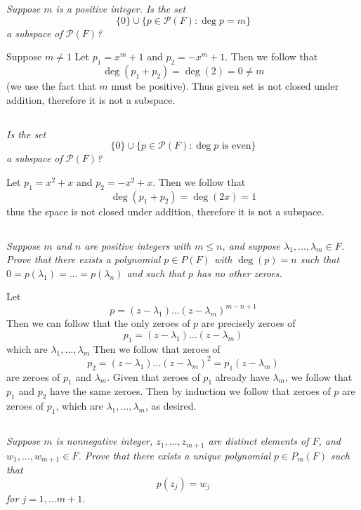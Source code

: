 \documentclass[11pt,oneside,titlepage]{book}
\begin{document}
\textit{Suppose $m$ is a positive integer. Is the set}
$$ \{0\} \cup \{p \in \mathcal{P}(F): \deg p = m\}$$
\textit{a subspace of $\mathcal{P}(F)$?}

Suppose $m \neq 1$
Let $p_1 = x^m + 1$ and $p_2 = -x^m + 1$. Then we follow that
$$\deg(p_1 + p_2) = \deg(2) = 0 \neq m $$
(we use the fact that $m$ must be positive). Thus given set is not closed under addition,
therefore it is not a subspace.

\subsection{}

\textit{Is the set}
$$\{0\} \cup \{p \in \mathcal{P}(F): \deg p \text{ is even}\}$$
\textit{a subspace of $\mathcal P (F)$?}

Let $p_1 = x^2 + x$ and $p_2 = -x^2 + x$. Then we follow that
$$\deg(p_1 + p_2) = \deg(2x) = 1$$
thus the space is not closed under addition, therefore it is not a subspace.

\subsection{}

\textit{Suppose $m$ and $n$ are positive integers with $m \leq n$, and suppose
  $\lambda_1, ..., \lambda_m \in F$. Prove that there exists a polynomial $p \in P(F)$
  with $\deg(p) = n$ such that $0 = p(\lambda_1) = ... = p(\lambda_n)$ and such that
  $p$ has no other zeroes.}

Let
$$p = (z - \lambda_1) ... (z - \lambda_m)^{m - n + 1}$$
Then we can follow that the only zeroes of $p$ are precisely zeroes of
$$p_1 = (z - \lambda_1) ... (z - \lambda_{m})$$
which are $\lambda_1, ..., \lambda_{m}$
Then  we follow that zeroes of
$$p_2 = (z - \lambda_1) ... (z - \lambda_{m})^2 = p_1(z - \lambda_m)$$
are zeroes of $p_1$ and $\lambda_m$. Given that zeroes of $p_1$ already have $\lambda_m$, we
follow that $p_1$ and $p_2$ have the same zeroes. Then by induction we follow that
zeroes of $p$ are zeroes of $p_1$, which are $\lambda_1, ..., \lambda_m$, as desired.

\subsection{}

\textit{Suppose $m$ is nonnegative integer, $z_1, ..., z_{m + 1}$ are distinct elements of $F$,
  and $w_1, ..., w_{m + 1} \in F$. Prove that there exists a unique polynomial $p \in P_m(F)$
  such that }
$$p(z_j) = w_j$$
\textit{for $j = 1, ... m + 1$.}
\end{document}
